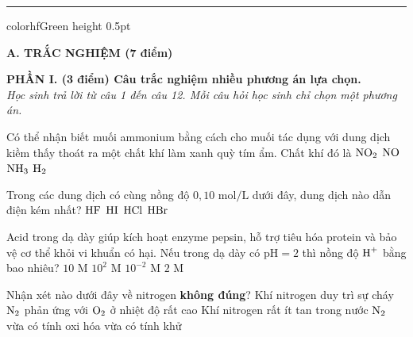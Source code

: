 \documentclass[11pt,a4paper]{article}
\begin{document}
\vspace{4pt}
\hrule color{hfGreen} height 0.5pt

\vspace{4pt}
\noindent
{\color{mainGreen}\textbf{\Large A. TRẮC NGHIỆM (7 điểm)}}

\vspace{3pt}
\noindent
{\color{mainGreen}\textbf{\large PHẦN I. (3 điểm) Câu trắc nghiệm nhiều phương án lựa chọn.}}\\
\textit{\small Học sinh trả lời từ câu 1 đến câu 12. Mỗi câu hỏi học sinh chỉ chọn một phương án.}
\vspace{2pt}

\begin{ex}
Có thể nhận biết muối ammonium bằng cách cho muối tác dụng với dung dịch kiềm thấy thoát ra một chất khí làm xanh quỳ tím ẩm. Chất khí đó là
\choice
{$\ce{NO2}$}
{$\ce{NO}$}
{\True $\ce{NH3}$}
{$\ce{H2}$}

\end{ex}
\begin{ex}
Trong các dung dịch có cùng nồng độ $0,10\text{ mol/L}$ dưới đây, dung dịch nào dẫn điện kém nhất?
\choice
{\True $\ce{HF}$}
{$\ce{HI}$}
{$\ce{HCl}$}
{$\ce{HBr}$}

\end{ex}
\begin{ex}
Acid trong dạ dày giúp kích hoạt enzyme pepsin, hỗ trợ tiêu hóa protein và bảo vệ cơ thể khỏi vi khuẩn có hại. Nếu trong dạ dày có $\text{pH} = 2$ thì nồng độ $\ce{H+}$ bằng bao nhiêu?
\choice
{$10\text{ M}$}
{$10^2\text{ M}$}
{\True $10^{-2}\text{ M}$}
{$2\text{ M}$}

\end{ex}
\begin{ex}
Nhận xét nào dưới đây về nitrogen \textbf{không đúng}?
\choice
{\True Khí nitrogen duy trì sự cháy}
{$\ce{N2}$ phản ứng với $\ce{O2}$ ở nhiệt độ rất cao}
{Khí nitrogen rất ít tan trong nước}
{$\ce{N2}$ vừa có tính oxi hóa vừa có tính khử}

\end{ex}
\end{document}
